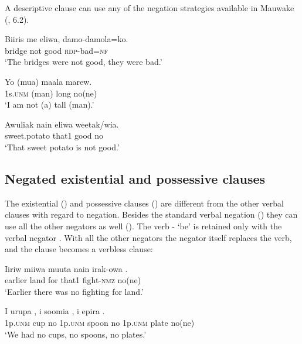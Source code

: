 A descriptive clause can use any of the negation strategies available in Mauwake (, 6.2). 

\ea%
\label{ex:x990}
\gll Biiris  me  eliwa,  damo-damola=ko. \\
     bridge  not  good  \textsc{rdp}-bad=\textsc{nf} \\
\glt `The bridges were not good, they were bad.'
\z

\ea%
\label{ex:x988}
\gll Yo  (mua)  maala  marew. \\
     1s.\textsc{unm}  (man)  long  no(ne) \\
\glt `I am not (a) tall (man).'
\z

\ea%
\label{ex:x989}
\gll Awuliak  nain  eliwa  weetak/wia. \\
     sweet.potato  that1  good  no \\
\glt `That sweet potato is not good.'
\z

\subsection{Negated existential and possessive clauses}
{}
The existential () and possessive clauses () are different from the other verbal clauses with regard to negation. Besides the standard verbal negation () they can use all the other negators as well (). The verb - `be' is retained only with the verbal negator . With all the other negators the negator itself replaces the verb, and the clause becomes a verbless clause:

\ea%
\label{ex:x982}
\gll Iiriw  miiwa  muuta  nain  irak-owa  . \\
     earlier  land  for  that1  fight-\textsc{nmz}  no(ne) \\
\glt `Earlier there was no fighting for land.'
\z

\ea%
\label{ex:x983}
\gll I  urupa  ,  i  soomia  ,  i epira  . \\
     1p.\textsc{unm}  cup  no  1p.\textsc{unm}  spoon  no  1p.\textsc{unm} plate  no(ne) \\
\glt `We had no cups, no spoons, no plates.'
\z

